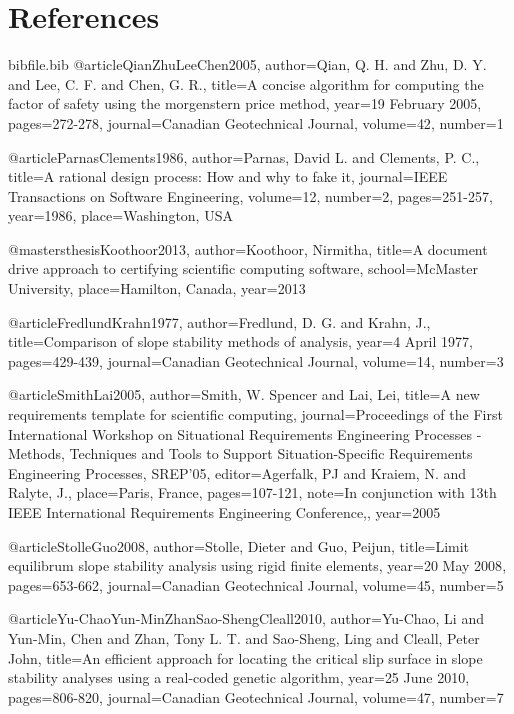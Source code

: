 \documentclass[12pt]{article}
\begin{document}
\section{References}
\label{Sec:Refe}
\begin{filecontents*}{bibfile.bib}
@article{QianZhuLeeChen2005,
author={Qian, Q. H. and Zhu, D. Y. and Lee, C. F. and Chen, G. R.},
title={A concise algorithm for computing the factor of safety using the morgenstern price method},
year={19 February 2005},
pages={272-278},
journal={Canadian Geotechnical Journal},
volume={42},
number={1}}

@article{ParnasClements1986,
author={Parnas, David L. and Clements, P. C.},
title={A rational design process: How and why to fake it},
journal={IEEE Transactions on Software Engineering},
volume={12},
number={2},
pages={251-257},
year={1986},
place={Washington, USA}}

@mastersthesis{Koothoor2013,
author={Koothoor, Nirmitha},
title={A document drive approach to certifying scientific computing software},
school={McMaster University},
place={Hamilton, Canada},
year={2013}}

@article{FredlundKrahn1977,
author={Fredlund, D. G. and Krahn, J.},
title={Comparison of slope stability methods of analysis},
year={4 April 1977},
pages={429-439},
journal={Canadian Geotechnical Journal},
volume={14},
number={3}}

@article{SmithLai2005,
author={Smith, W. Spencer and Lai, Lei},
title={A new requirements template for scientific computing},
journal={Proceedings of the First International Workshop on Situational Requirements Engineering Processes - Methods, Techniques and Tools to Support Situation-Specific Requirements Engineering Processes, SREP'05},
editor={Agerfalk, PJ and Kraiem, N. and Ralyte, J.},
place={Paris, France},
pages={107-121},
note={In conjunction with 13th IEEE International Requirements Engineering Conference,},
year={2005}}

@article{StolleGuo2008,
author={Stolle, Dieter and Guo, Peijun},
title={Limit equilibrum slope stability analysis using rigid finite elements},
year={20 May 2008},
pages={653-662},
journal={Canadian Geotechnical Journal},
volume={45},
number={5}}

@article{Yu-ChaoYun-MinZhanSao-ShengCleall2010,
author={Yu-Chao, Li and Yun-Min, Chen and Zhan, Tony L. T. and Sao-Sheng, Ling and Cleall, Peter John},
title={An efficient approach for locating the critical slip surface in slope stability analyses using a real-coded genetic algorithm},
year={25 June 2010},
pages={806-820},
journal={Canadian Geotechnical Journal},
volume={47},
number={7}}
\end{filecontents*}
\nocite{*}
\printbibliography[heading=none]
\end{document}
